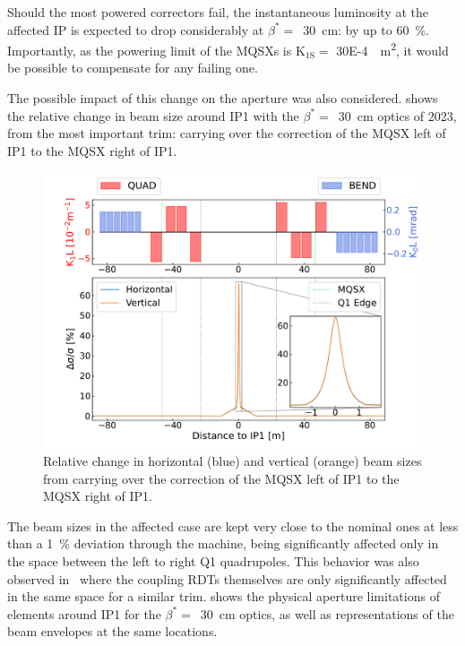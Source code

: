 Should the most powered correctors fail, the instantaneous luminosity at the affected IP is expected to drop considerably at \(\beta^{\ast} =\)~\qty{30}{\centi\meter}: by up to \qty{60}{\percent}.
Importantly, as the powering limit of the MQSXs is \(\mathrm{K_{1S}} =\) \qty{30E-4}{\per\square\meter}, it would be possible to compensate for any failing one.
\newpage

The possible impact of this change on the aperture was also considered.
 shows the relative change in beam size around IP\num{1} with the \(\beta^{\ast} =\)~\qty{30}{\centi\meter} optics of \num{2023}, from the most important trim: carrying over the correction of the MQSX left of IP\num{1} to the MQSX right of IP\num{1}.

\begin{figure}[!htb]
    \centering
    \includegraphics*[width=\textwidth]{Figures/IR_Coupling_Correction/carry_over_to_ir1_right_beam_size_impact.pdf}
    \caption{Relative change in horizontal (\textcolor{mplblue}{blue}) and vertical (\textcolor{mplorange}{orange}) beam sizes from carrying over the correction of the MQSX left of IP\num{1} to the MQSX right of IP\num{1}.}
    \label{figure:carry_over_impact_on_beam_size}
\end{figure}

The beam sizes in the affected case are kept very close to the nominal ones at less than a \qty{1}{\percent} deviation through the machine, being significantly affected only in the space between the left to right Q\num{1} quadrupoles.
This behavior was also observed in~\cite{PRAB:Hofer:Coupling_Local_Observables} where the coupling \glspl{RDT} themselves are only significantly affected in the same space for a similar trim.
 shows the physical aperture limitations of elements around IP\num{1} for the \(\beta^{\ast} =\)~\qty{30}{\centi\meter} optics, as well as representations of the beam envelopes at the same locations.

